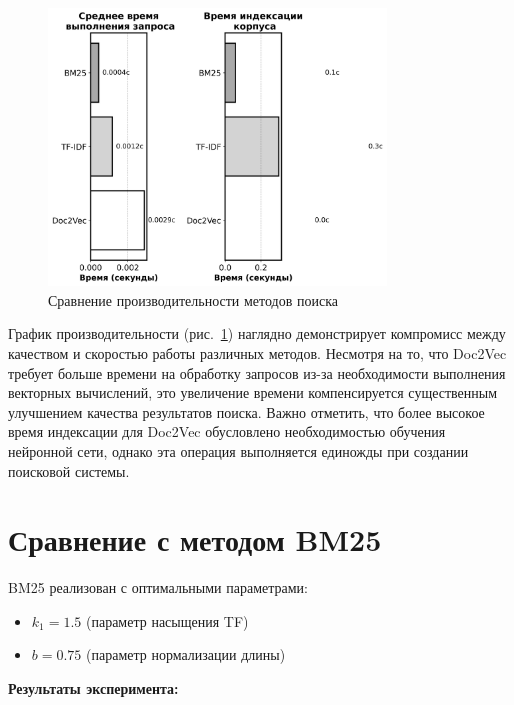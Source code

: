 \begin{figure}[H]
	\centering
	\includegraphics[width=0.8\textwidth]{images/diploma_bw_plots/performance_comparison_bw.png}
	\caption{Сравнение производительности методов поиска}
	\label{fig:performance_comparison}
\end{figure}

График производительности (рис.~\ref{fig:performance_comparison}) наглядно демонстрирует компромисс между качеством и скоростью работы различных методов. Несмотря на то, что Doc2Vec требует больше времени на обработку запросов из-за необходимости выполнения векторных вычислений, это увеличение времени компенсируется существенным улучшением качества результатов поиска. Важно отметить, что более высокое время индексации для Doc2Vec обусловлено необходимостью обучения нейронной сети, однако эта операция выполняется единожды при создании поисковой системы.

\section{Сравнение с методом BM25}

BM25 реализован с оптимальными параметрами:
\begin{itemize}
	\item $k_1 = 1.5$ (параметр насыщения TF)
	\item $b = 0.75$ (параметр нормализации длины)
\end{itemize}

\textbf{Результаты эксперимента:}

